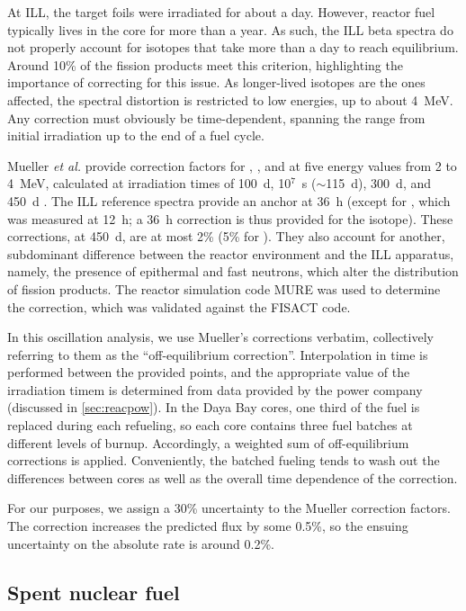 \documentclass[../thesis.tex]{subfiles}
\begin{document}
At ILL, the target foils were irradiated for about a day. However, reactor fuel typically lives in the core for more than a year. As such, the ILL beta spectra do not properly account for isotopes that take more than a day to reach equilibrium. Around 10\% of the fission products meet this criterion, highlighting the importance of correcting for this issue. As longer-lived isotopes are the ones affected, the spectral distortion is restricted to low energies, up to about 4~MeV. Any correction must obviously be time-dependent, spanning the range from initial irradiation up to the end of a fuel cycle.

Mueller \emph{et al.} provide correction factors for \urfive, \punine, and \puone at five energy values from 2 to 4~MeV, calculated at irradiation times of 100~d, 10$^7$~s ($\sim$115~d), 300~d, and 450~d \cite{PhysRevC.83.054615}. The ILL reference spectra provide an anchor at 36~h (except for \urfive, which was measured at 12~h; a 36~h correction is thus provided for the isotope). These corrections, at 450~d, are at most 2\% (5\% for \urfive). They also account for another, subdominant difference between the reactor environment and the ILL apparatus, namely, the presence of epithermal and fast neutrons, which alter the distribution of fission products. The reactor simulation code MURE was used to determine the correction, which was validated against the FISACT code.

In this oscillation analysis, we use Mueller's corrections verbatim, collectively referring to them as the ``off-equilibrium correction''. Interpolation in time is performed between the provided points, and the appropriate value of the irradiation timem is determined from data provided by the power company (discussed in \autoref{sec:reacpow}). In the Daya Bay cores, one third of the fuel is replaced during each refueling, so each core contains three fuel batches at different levels of burnup. Accordingly, a weighted sum of off-equilibrium corrections is applied. Conveniently, the batched fueling tends to wash out the differences between cores as well as the overall time dependence of the correction.

For our purposes, we assign a 30\% uncertainty to the Mueller correction factors. The correction increases the predicted flux by some 0.5\%, so the ensuing uncertainty on the absolute rate is around 0.2\%.

\subsection{Spent nuclear fuel}
\label{sec:snfcorr}
\end{document}
